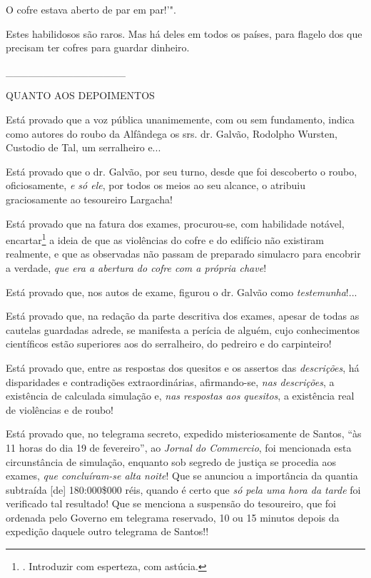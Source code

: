 O cofre estava aberto de par em par!'".

Estes habilidosos são raros. Mas há deles em todos os países, para
flagelo dos que precisam ter cofres para guardar dinheiro.

\_\_\_\_\_\_\_\_\_\_\_\_\_\_\_\_

QUANTO AOS DEPOIMENTOS

Está provado que a voz pública unanimemente, com ou sem fundamento,
indica como autores do roubo da Alfândega os srs. dr. Galvão, Rodolpho
Wursten, Custodio de Tal, um serralheiro e...

Está provado que o dr. Galvão, por seu turno, desde que foi descoberto o
roubo, oficiosamente, \emph{e só ele}, por todos os meios ao seu
alcance, o atribuiu graciosamente ao tesoureiro Largacha!

Está provado que na fatura dos exames, procurou-se, com habilidade
notável, encartar\footnote{. Introduzir com esperteza, com astúcia.} a
ideia de que as violências do cofre e do edifício não existiram
realmente, e que as observadas não passam de preparado simulacro para
encobrir a verdade, \emph{que era a abertura do cofre com a própria
chave}!

Está provado que, nos autos de exame, figurou o dr. Galvão como
\emph{testemunha}!...

Está provado que, na redação da parte descritiva dos exames, apesar de
todas as cautelas guardadas adrede, se manifesta a perícia de alguém,
cujo conhecimentos científicos estão superiores aos do serralheiro, do
pedreiro e do carpinteiro!

Está provado que, entre as respostas dos quesitos e os assertos das
\emph{descrições}, há disparidades e contradições extraordinárias,
afirmando-se, \emph{nas descrições}, a existência de calculada simulação
e, \emph{nas respostas aos quesitos}, a existência real de violências e
de roubo!

Está provado que, no telegrama secreto, expedido misteriosamente de
Santos, ``às 11 horas do dia 19 de fevereiro'', ao \emph{Jornal do
Commercio}, foi mencionada esta circunstância de simulação, enquanto sob
segredo de justiça se procedia aos exames, \emph{que concluíram-se alta
noite}! Que se anunciou a importância da quantia subtraída {[}de{]}
180:000\$000 réis, quando é certo que \emph{só pela uma hora da tarde}
foi verificado tal resultado! Que se menciona a suspensão do tesoureiro,
que foi ordenada pelo Governo em telegrama reservado, 10 ou 15 minutos
depois da expedição daquele outro telegrama de Santos!!

